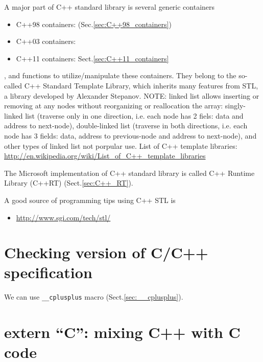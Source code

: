 A major part of C++ standard library is several generic containers
\begin{itemize}
  \item C++98 containers: (Sec.\ref{sec:C++98_containers})
  \item C++03 containers: 
  \item C++11 containers: Sect.\ref{sec:C++11_containers}
\end{itemize}
, and functions to utilize/manipulate these
containers. They belong to the so-called C++ Standard Template Library, which
inherits many features from STL, a library developed by Alexander Stepanov.
NOTE: linked list allows inserting or removing at any nodes without reorganizing
or reallocation the array: singly-linked list (traverse only in one direction,
i.e. each node has 2 fiels: data and address to next-node), double-linked list
(traverse in both directions, i.e. each node has 3 fields:
data, address to previous-node and address to next-node), and other types of
linked list not porpular use. List of C++ template libraries:
\url{http://en.wikipedia.org/wiki/List_of_C++_template_libraries}


The Microsoft implementation of C++ standard library is called C++ Runtime Library (C++RT) (Sect.\ref{sec:C++_RT}).

A good source of programming tips using C++ STL is
\begin{itemize}
  \item \url{http://www.sgi.com/tech/stl/}
\end{itemize}
% 

\section{Checking version of C/C++ specification}
\label{sec:check-language-support}

We can use \verb!__cplusplus! macro (Sect.\ref{sec:__cplusplus}).

\section{extern ``C'': mixing C++ with C code}
\label{sec:extern_''C''}

